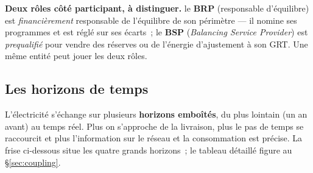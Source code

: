 \documentclass[11pt,a4paper]{article}
\begin{document}
\noindent\textbf{Deux rôles côté participant, à distinguer.} le \textbf{BRP}
(responsable d'équilibre) est \emph{financièrement} responsable de l'équilibre
de son périmètre — il nomine ses programmes et est réglé sur ses écarts~; le
\textbf{BSP} (\emph{Balancing Service Provider}) est \emph{prequalifié} pour
vendre des réserves ou de l'énergie d'ajustement à son GRT. Une même entité
peut jouer les deux rôles.

\subsection{Les horizons de temps}
\label{sec:horizons}

L'électricité s'échange sur plusieurs \textbf{horizons emboîtés}, du plus
lointain (un an avant) au temps réel. Plus on s'approche de la livraison, plus
le pas de temps se raccourcit et plus l'information sur le réseau et la
consommation est précise. La frise ci-dessous situe les quatre grands
horizons~; le tableau détaillé figure au \S\ref{sec:coupling}.

\begin{center}
\end{center}
\end{document}
